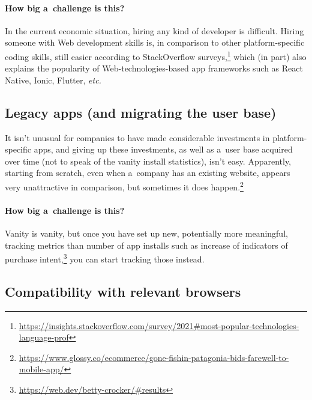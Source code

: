 \documentclass[sigconf]{acmart}
\begin{document}
\paragraph{How big a~challenge is this?}

In the current economic situation, hiring any kind of developer is difficult. Hiring someone with Web development skills is, in comparison to other platform-specific coding skills, still easier according to StackOverflow surveys,\footnote{\url{https://insights.stackoverflow.com/survey/2021\#most-popular-technologies-language-prof}} which (in part) also explains the popularity of Web-technologies-based app frameworks such as React Native, Ionic, Flutter, \textit{etc.}

\subsection{Legacy apps (and migrating the user base)}

It isn't unusual for companies to have made considerable investments in platform-specific apps, and giving up these investments, as well as a~user base acquired over time (not to speak of the vanity install statistics), isn't easy. Apparently, starting from scratch, even when a~company has an existing website, appears very unattractive in comparison, but sometimes it does happen.\footnote{\url{https://www.glossy.co/ecommerce/gone-fishin-patagonia-bids-farewell-to-mobile-app/}}

\paragraph{How big a~challenge is this?}

Vanity is vanity, but once you have set up new, potentially more meaningful, tracking metrics than number of app installs such as increase of indicators of purchase intent,\footnote{\url{https://web.dev/betty-crocker/\#results}} you can start tracking those instead.

\subsection{Compatibility with relevant browsers}
\end{document}
